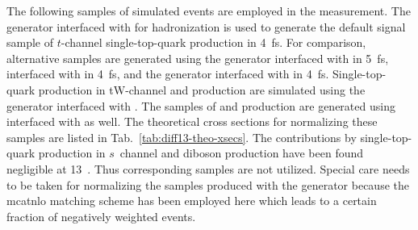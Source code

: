 The following samples of simulated events are employed in the measurement. The \MGAMC generator interfaced with  for hadronization is used to generate the default signal sample of $t$-channel single-top-quark production in 4~\gls{fs}. For comparison, alternative samples are generated using the \MGAMC generator interfaced with  in 5~\gls{fs}, \MGAMC interfaced with \HERWIG in 4~\gls{fs}, and the \POWHEG generator interfaced with \PYTHIA in 4~\gls{fs}. Single-top-quark production in tW-channel and \ttbar production are simulated using the \POWHEG generator interfaced with . The samples of \wjets and \zjets production are generated using \MGAMC interfaced with  as well. The theoretical cross sections for normalizing these samples are listed in Tab.~\ref{tab:diff13-theo-xsecs}. The contributions by single-top-quark production in $s$~channel and diboson production have been found negligible at 13~\TeV. Thus corresponding samples are not utilized. Special care needs to be taken for normalizing the samples produced with the \MGAMC generator because the \gls{mcatnlo} matching scheme has been employed here which leads to a certain fraction of negatively weighted events.


